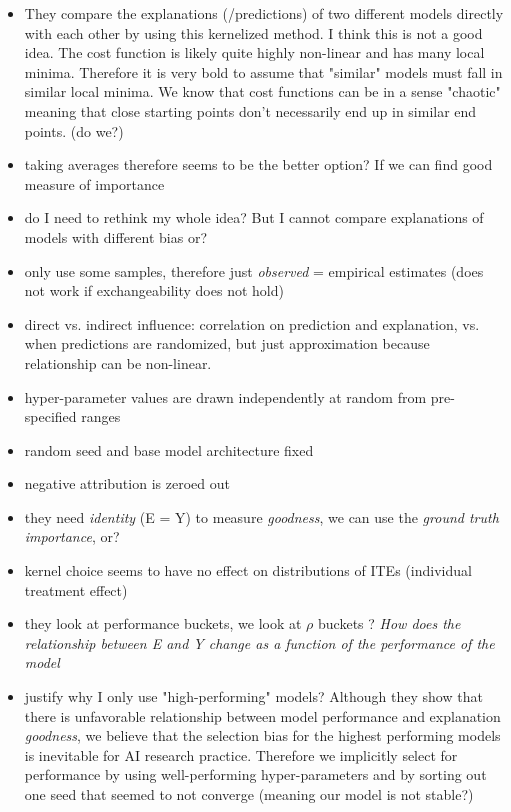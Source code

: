 \begin{itemize}
\begin{quote}
    \end{quote}
    \item They compare the explanations (/predictions) of two different models directly with each other by using this kernelized method. I think this is not a good idea. The cost function is likely quite highly non-linear and has many local minima. Therefore it is very bold to assume that "similar" models must fall in similar local minima. We know that cost functions can be in a sense "chaotic" meaning that close starting points don't necessarily end up in similar end points. (do we?)
    \item taking averages therefore seems to be the better option? If we can find good measure of importance
    \item do I need to rethink my whole idea? But I cannot compare explanations of models with different bias or? 
    \item only use some samples, therefore just \textit{observed} = empirical estimates (does not work if exchangeability does not hold)
    \item direct vs. indirect influence: correlation on prediction and explanation, vs. when predictions are randomized, but just approximation because relationship can be non-linear.
    \item hyper-parameter values are drawn independently at random from pre-specified ranges
    \item random seed and base model architecture fixed
    \item negative attribution is zeroed out
    \item they need \textit{identity} (E = Y) to measure \textit{goodness}, we can use the \textit{ground truth importance}, or?
    \item kernel choice seems to have no effect on distributions of ITEs (individual treatment effect)
    \item they look at performance buckets, we look at $\rho$  buckets ? \textit{How does the relationship between E and Y change as a function of the performance of the model}
    \item justify why I only use "high-performing" models? Although they show that there is unfavorable relationship between model performance and explanation \textit{goodness}, we believe that the selection bias for the highest performing models is inevitable for AI research practice. Therefore we implicitly select for performance by using well-performing hyper-parameters and by sorting out one seed that seemed to not converge (meaning our model is not stable?)

\end{itemize}
